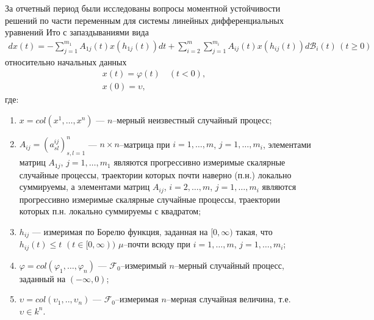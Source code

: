 За отчетный период были исследованы вопросы моментной устойчивости
решений по части переменным для системы линейных дифференциальных
уравнений Ито с запаздываниями вида
\begin{equation}
\label{eq:kri-1}
\begin{array}{crl}
dx(t) = - \sum \limits_{j=1}^{m_1}A_{1j}(t)x(h_{1j}(t))dt + \sum
\limits_{i=2}^m\sum
\limits_{j=1}^{m_i}A_{ij}(t)x(h_{ij}(t))d\mathcal B_i(t) \, (t \ge
0)
\end{array}
\end{equation}
относительно начальных данных
\begin{gather}
\label{eq:kri-1a}
x(t) = \varphi(t) \quad (t <0), \quad   
\\
\label{eq:kri-1b}
x(0) = \upsilon,  
\end{gather}
где:
\begin{enumerate}
    \item $x = col(x^1,\dots,x^n)$ --- $n$--мерный неизвестный случайный
    процесс;
    
    \item  $A_{ij} = (a^{ij}_{sl})^n_{s,l=1}$ --- $n \times n$--матрица при
    $i = 1,\dots,m$, $j = 1,\dots,m_i$, элементами матриц $A_{1j}$, $j =
    1,\dots,m_1$ являются прогрессивно измеримые скалярные случайные
    процессы, траектории которых почти наверно (п.н.) локально
    суммируемы, а элементами матриц $A_{ij}$, $i = 2,\dots,m$, $j =
    1,\dots,m_i$ являются прогрессивно измеримые скалярные случайные
    процессы, траектории которых п.н. локально суммируемы с квадратом;
    
    \item  $ h_{ij}$ --- измеримая по Борелю функция, заданная на $[0,
    \infty)$ такая, что $ h_{ij}(t)\leq t {\,} {\,} (t \in [0, \infty))$
    $\mu $--почти всюду при $i = 1,\dots,m$, $j = 1,\dots,m_i$;
    
    \item  $\varphi = col (\varphi _1,\dots, \varphi _n)$ --- ${\mathcal
    F}_0$--измеримый $n$--мерный случайный процесс, заданный на
    $(-\infty , 0)$;
    
    \item  $\upsilon = col (\upsilon_1,.., \upsilon_n)$ --- ${\mathcal
    F}_0$--измеримая $n$--мерная случайная величина, т.е. $\upsilon \in
    k^n$.
\end{enumerate}

